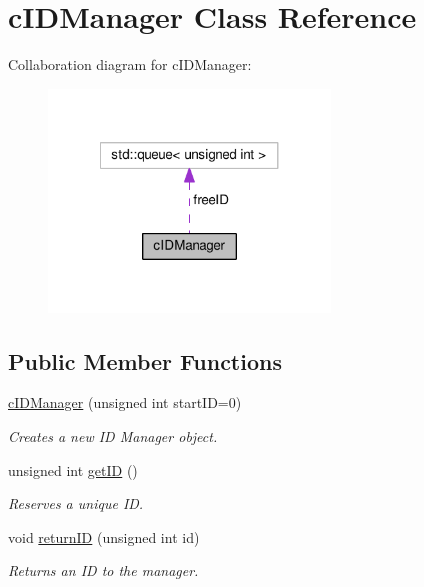 \hypertarget{classcIDManager}{\section{c\-I\-D\-Manager \-Class \-Reference}
\label{de/dd4/classcIDManager}
}


\-Collaboration diagram for c\-I\-D\-Manager\-:\nopagebreak
\begin{figure}[H]
\begin{center}
\leavevmode
\includegraphics[width=212pt]{db/d8e/classcIDManager__coll__graph}
\end{center}
\end{figure}
\subsection*{\-Public \-Member \-Functions}
\begin{DoxyCompactItemize}
\item 
\hyperlink{classcIDManager_a59021595aaf85ebc151c207a8a04f101}{c\-I\-D\-Manager} (unsigned int start\-I\-D=0)
\begin{DoxyCompactList}\small\item\em \-Creates a new \-I\-D \-Manager object. \end{DoxyCompactList}\item 
unsigned int \hyperlink{classcIDManager_a45420147e785cc219743e9aa2c336501}{get\-I\-D} ()
\begin{DoxyCompactList}\small\item\em \-Reserves a unique \-I\-D. \end{DoxyCompactList}\item 
void \hyperlink{classcIDManager_a6671d898740f88cf40860b0b9e119b02}{return\-I\-D} (unsigned int id)
\begin{DoxyCompactList}\small\item\em \-Returns an \-I\-D to the manager. \end{DoxyCompactList}\end{DoxyCompactItemize}
